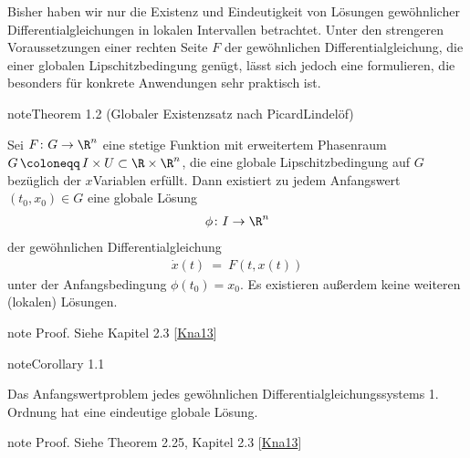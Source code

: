 \documentclass[letterpaper,10pt,english]{jupyterBook}
\begin{document}
\sphinxAtStartPar
Bisher haben wir nur die Existenz und Eindeutigkeit von Lösungen gewöhnlicher Differentialgleichungen in lokalen Intervallen betrachtet.
Unter den strengeren Voraussetzungen einer rechten Seite \(F\) der gewöhnlichen Differentialgleichung, die einer globalen Lipschitzbedingung genügt, lässt sich jedoch eine  formulieren, die besonders für konkrete Anwendungen sehr praktisch ist.
\label{ode/repetition:satz:picardlindeloef}
\begin{sphinxadmonition}{note}{Theorem 1.2 (Globaler Existenzsatz nach Picard\sphinxhyphen{}Lindelöf)}



\sphinxAtStartPar
Sei \(F\colon G\to\R^n\) eine stetige Funktion mit erweitertem Phasenraum \(G \, \coloneqq \, I \times U \subset \R\times\R^n\), die eine globale Lipschitzbedingung auf \(G\) bezüglich der \(x\)\sphinxhyphen{}Variablen erfüllt.
Dann existiert zu jedem Anfangswert \((t_0,x_0) \in G\) eine globale Lösung
\begin{equation*}
\begin{split}\phi \colon I \to \R^n\end{split}
\end{equation*}
\sphinxAtStartPar
der gewöhnlichen Differentialgleichung
\begin{equation*}
\begin{split}\dot{x}(t) \ = \ F(t,x(t))\end{split}
\end{equation*}
\sphinxAtStartPar
unter der Anfangsbedingung \(\phi(t_0)=x_0\).
Es existieren außerdem keine weiteren (lokalen) Lösungen.
\end{sphinxadmonition}

\begin{sphinxadmonition}{note}
\sphinxAtStartPar
Proof. Siehe Kapitel 2.3 {[}\hyperlink{cite.references:id5}{Kna13}{]}
\end{sphinxadmonition}
\label{ode/repetition:cor:eindeutigkeitlinear}
\begin{sphinxadmonition}{note}{Corollary 1.1}



\sphinxAtStartPar
Das Anfangswertproblem jedes  gewöhnlichen Differentialgleichungssystems 1. Ordnung hat eine eindeutige globale Lösung.
\end{sphinxadmonition}

\begin{sphinxadmonition}{note}
\sphinxAtStartPar
Proof. Siehe Theorem 2.25, Kapitel 2.3 {[}\hyperlink{cite.references:id5}{Kna13}{]}
\end{sphinxadmonition}
\end{document}
